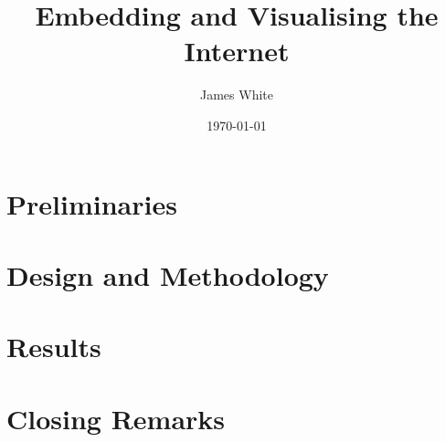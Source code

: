 \documentclass[authoryearcitations]{UoYCSproject}
\author{James White}
\title{Embedding and Visualising the Internet}
\date{\today}
\begin{document}
\maketitle

\cleardoublepage
\part{Preliminaries}
\label{sec:prelims}
\thispagestyle{empty}\cleardoublepage


\part{Design and Methodology}
\thispagestyle{empty}\cleardoublepage
\label{sec:design}


\part{Results}
\thispagestyle{empty}\cleardoublepage
\label{sec:results}


\part{Closing Remarks}
\thispagestyle{empty}\cleardoublepage
\label{sec:closing}




\end{document}
